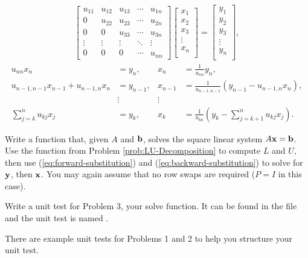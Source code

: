 \begin{align*}
\left[\begin{array}{ccccc}
u_{11} & u_{12} & u_{13} & \cdots & u_{1n} \\
0      & u_{22} & u_{23} & \cdots & u_{2n} \\
0      & 0      & u_{33} & \cdots & u_{3n} \\
\vdots & \vdots & \vdots & \ddots & \vdots \\
0      & 0      & 0      & \cdots & u_{nn}
\end{array}\right]
\left[\begin{array}{c}
x_1 \\ x_2 \\ x_3 \\ \vdots \\ x_n \\
\end{array}\right]
=
\left[\begin{array}{c}
y_1 \\ y_2 \\ y_3 \\ \vdots \\ y_n \\
\end{array}\right],
\end{align*}
\begin{align}
\nonumber u_{nn}x_n &= y_n, & x_n &= \frac{1}{u_{nn}}y_n, \\
\nonumber u_{n-1,n-1}x_{n-1} + u_{n-1,n}x_{n} &= y_{n-1}, & x_{n-1} &= \frac{1}{u_{n-1,n-1}}\left(y_{n-1} - u_{n-1,n}x_{n}\right),\\
\nonumber & \vdots & \vdots & \\
\sum_{j=k}^{n}u_{kj}x_j &= y_k, & x_k &= \frac{1}{u_{kk}}\left(y_k - \sum_{j=k+1}^{n}u_{kj}x_j\right).
\label{eq:backward-substitution}
\end{align}

\begin{problem} %
Write a function that, given $A$ and $\mathbf{b}$, solves the square linear system $A\mathbf{x} = \mathbf{b}$.
Use the function from Problem \ref{prob:LU-Decomposition} to compute $L$ and $U$, then use (\ref{eq:forward-substitution}) and (\ref{eq:backward-substitution}) to solve for $\mathbf{y}$, then $\mathbf{x}$.
You may again assume that no row swaps are required ($P = I$ in this case).
\label{prob:substitute-solve}
\end{problem}

\begin{unittest}%
Write a unit test for Problem 3, your solve function. It can be found in the  file and the unit test is named . 

\noindent There are example unit tests for Problems 1 and 2 to help you structure your unit test.
\end{unittest}

